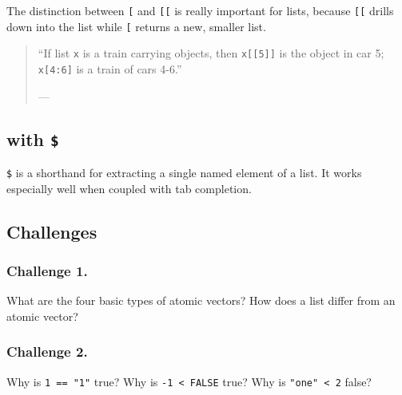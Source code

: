 \documentclass[
]{book}
\newenvironment{Shaded}{\begin{snugshade}}{\end{snugshade}}
\newcommand{\CommentTok}[1]{\textcolor[rgb]{0.56,0.35,0.01}{\textit{#1}}}
\newcommand{\NormalTok}[1]{#1}
\newcommand{\OperatorTok}[1]{\textcolor[rgb]{0.81,0.36,0.00}{\textbf{#1}}}
\begin{document}
The distinction between \texttt{{[}} and \texttt{{[}{[}} is really important for lists, because \texttt{{[}{[}} drills down into the list while \texttt{{[}} returns a new, smaller list.

\begin{quote}
``If list \texttt{x} is a train carrying objects, then \texttt{x{[}{[}5{]}{]}} is
the object in car 5; \texttt{x{[}4:6{]}} is a train of cars 4-6.''

--- \citet{RLangTip}
\end{quote}

\hypertarget{with-2}{%
\subsection{\texorpdfstring{with \texttt{\$}}{with \$}}\label{with-2}}

\texttt{\$} is a shorthand for extracting a single named element of a list. It works especially well when coupled with tab completion.

\begin{Shaded}
\end{Shaded}

\hypertarget{challenges-13}{%
\subsection{Challenges}\label{challenges-13}}

\hypertarget{challenge-1.-10}{%
\subsubsection*{Challenge 1.}\label{challenge-1.-10}}

What are the four basic types of atomic vectors? How does a list differ from an atomic vector?

\hypertarget{challenge-2.-9}{%
\subsubsection*{Challenge 2.}\label{challenge-2.-9}}

Why is \texttt{1\ ==\ "1"} true? Why is \texttt{-1\ \textless{}\ FALSE} true? Why is \texttt{"one"\ \textless{}\ 2} false?
\end{document}
